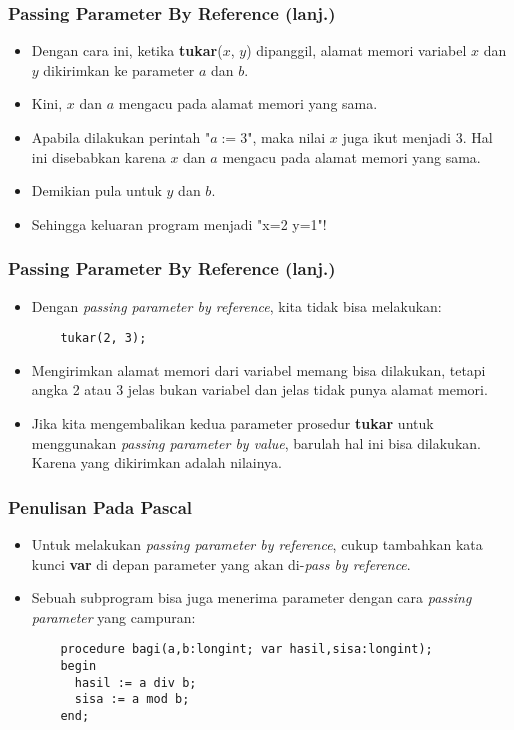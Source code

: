 \begin{frame}[fragile]
\frametitle{Passing Parameter By Reference (lanj.)}
\begin{itemize}
  \item Dengan cara ini, ketika \textbf{tukar}($x$, $y$) dipanggil, \alert{alamat memori variabel} $x$ dan $y$ dikirimkan ke parameter $a$ dan $b$.
  \item Kini, $x$ dan $a$ mengacu pada alamat memori yang sama.
  \item Apabila dilakukan perintah "$a := 3$", maka nilai $x$ juga ikut menjadi 3. Hal ini disebabkan karena $x$ dan $a$ mengacu pada \alert{alamat memori yang sama}.
  \item Demikian pula untuk $y$ dan $b$.
  \item Sehingga keluaran program menjadi "x=2 y=1"!
\end{itemize}
\end{frame}

\begin{frame}[fragile]
\frametitle{Passing Parameter By Reference (lanj.)}
\begin{itemize}
  \item Dengan \textit{passing parameter by reference}, kita tidak bisa melakukan:
  \begin{lstlisting}
    tukar(2, 3);
  \end{lstlisting}

  \item Mengirimkan alamat memori dari variabel memang bisa dilakukan, tetapi angka 2 atau 3 jelas bukan variabel dan jelas \alert{tidak punya alamat memori}.
  \item Jika kita mengembalikan kedua parameter prosedur \textbf{tukar} untuk menggunakan \textit{passing parameter by value}, barulah hal ini bisa dilakukan. Karena yang dikirimkan adalah \alert{nilainya}.
\end{itemize}
\end{frame}

\begin{frame}[fragile]
\frametitle{Penulisan Pada Pascal}
\begin{itemize}
  \item Untuk melakukan \textit{passing parameter by reference}, cukup tambahkan kata kunci \textbf{var} di depan parameter yang akan di-\textit{pass by reference}.
  \item Sebuah subprogram bisa juga menerima parameter dengan cara \textit{passing parameter} yang campuran:
  \begin{lstlisting}
    procedure bagi(a,b:longint; var hasil,sisa:longint);
    begin
      hasil := a div b;
      sisa := a mod b;
    end;
  \end{lstlisting}
\end{itemize}
\end{frame}

